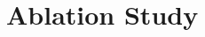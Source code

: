 \documentclass[lettersize,journal]{IEEEtran}
\begin{document}


\section{Ablation Study}
\label{sec:ablation}
\end{document}
